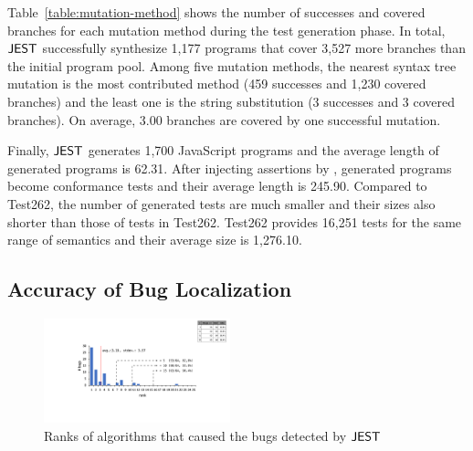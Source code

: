 Table~\ref{table:mutation-method} shows the number of successes and covered
branches for each mutation method during the test generation phase.  In total,
$\tool$ successfully synthesize 1,177 programs that cover 3,527
more branches than the initial program pool.  Among five mutation methods, the
nearest syntax tree mutation is the most contributed method (459
successes and 1,230 covered branches) and the least one is the string
substitution (3 successes and 3 covered branches).  On average,
3.00 branches are covered by one successful mutation.

Finally, $\tool$ generates 1,700 JavaScript programs and the average
length of generated programs is 62.31.  After injecting assertions by
, generated programs become conformance tests and
their average length is 245.90.  Compared to Test262, the number of
generated tests are much smaller and their sizes also shorter than those of tests
in Test262.  Test262 provides 16,251 tests for the same range of
semantics and their average size is 1,276.10.


\subsection{Accuracy of Bug Localization}

\begin{figure}[t]
  \centering
  \includegraphics[width=0.48\textwidth]{img/localize.pdf}
  \caption{Ranks of algorithms that caused the bugs detected by $\tool$}
  \label{fig:localize}
  \vspace*{-1em}
\end{figure}

